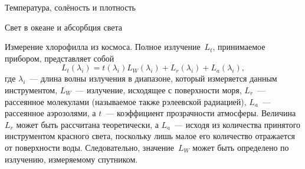 \begin{chapter}{Температура, солёность и плотность}
\begin{section}{Свет в океане и абсорбция света}
\begin{paragraph}{Измерение хлорофилла из космоса.}
Полное излучение~$L_t$, принимаемое прибором, представляет собой
\begin{equation}
 L_t(\lambda_i) = t(\lambda_i)L_W(\lambda_i) + L_r(\lambda_i) + L_a(\lambda_i),
\end{equation}
где $\lambda_i$~--- длина волны излучения в диапазоне, который измеряется
данным инструментом, $L_W$~--- излучение, исходящее с поверхности моря, 
$L_r$~--- рассеянное молекулами (называемое также рэлеевской радиацией), 
$L_a$~--- рассеянное аэрозолями, а $t$~--- коэффициент прозрачности атмосферы. 
Величина~$L_r$ может быть рассчитана теоретически, а $L_a$~--- исходя
из количества принятого инструментом красного света, поскольку лишь
малое его количество отражается от поверхности воды. Следовательно,
значение~$L_W$ может быть определено по излучению, измеряемому спутником. 
%


\end{paragraph}
\end{section}
\end{chapter}
